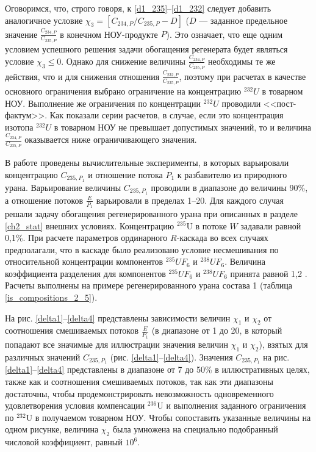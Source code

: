 Оговоримся, что, строго говоря, к \ref{d1_235}--\ref{d1_232} следует добавить аналогичное условие $\chi_3=\left[C_{234,P}/C_{235,P}-D\right]$ ($D$ --- заданное предельное значение $\frac{C_{234,P}}{C_{235,P}}$ в конечном НОУ-продукте $P$). Это означает, что еще одним условием успешного решения задачи обогащения регенерата будет являться условие $\chi_3 \leq0$. Однако для снижение величины $\frac{C_{234,P}}{C_{235,P}}$ необходимы те же действия, что и для снижения отношения $\frac{C_{232,P}}{C_{235,P}}$, поэтому при расчетах в качестве основного ограничения выбрано ограничение на концентрацию $^{232}U$ в товарном НОУ. Выполнение же ограничения по концентрации $^{232}U$ проводили <<пост-фактум>>. Как показали серии расчетов, в случае, если это концентрация изотопа $^{232}U$ в товарном НОУ не превышает допустимых значений, то и величина $\frac{C_{234,P}}{C_{235,P}}$ оказывается ниже ограничивающего значения.

В работе проведены вычислительные эксперименты, в которых варьировали концентрацию $C_{235, P_1}$ и отношение потока $P_1$ к разбавителю из природного урана. Варьирование величины $C_{235, P_1}$ проводили в диапазоне до величины 90\%, а отношение потоков $\frac{E}{P_1}$ варьировали в пределах 1--20. Для каждого случая решали задачу обогащения регенерированного урана при описанных в разделе \ref{ch2_stat} внешних условиях. Концентрацию $^{235}$U в потоке $W$ задавали равной 0,1\%. При расчете параметров ординарного $R$-каскада во всех случаях предполагали, что в каскаде было реализовано условие несмешивания по относительной концентрации компонентов $^{235}UF_6$ и $^{238}UF_6$. Величина коэффициента разделения для компонентов  $^{235}UF_6$ и $^{238}UF_6$ принята равной 1,2 \cite{smirnovEvolutionIsotopicComposition2012}. Расчеты выполнены на примере регенерированного урана состава 1 (таблица \ref{is_compositions_2_5}).

На рис. \ref{delta1}--\ref{delta4} представлены зависимости величин $\chi_1$ и $\chi_2$ от соотношения смешиваемых потоков $\frac{E}{P_1}$ (в диапазоне от 1 до 20, в который попадают все значимые для иллюстрации значения величин $\chi_1$ и $\chi_2$), взятых для различных значений $C_{235, P_1}$ (рис. \ref{delta1}--\ref{delta4}). Значения $C_{235, P_1}$ на рис. \ref{delta1}--\ref{delta4} представлены в диапазоне от 7 до 50\% в иллюстративных целях,  также как и соотношения смешиваемых потоков, так как эти диапазоны достаточны, чтобы продемонстрировать невозможность одновременного удовлетворения условия компенсации $^{236}$U и выполнения заданного ограничения по $^{232}$U в получаемом товарном НОУ. Чтобы сопоставить указанные величины на одном рисунке, величина $\chi_2$ была умножена на специально подобранный числовой коэффициент, равный $10^{6}$.

